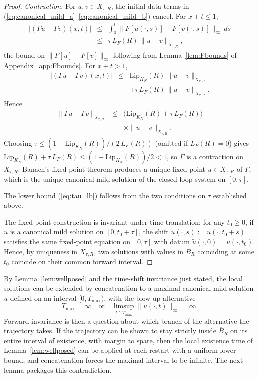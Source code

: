 \documentclass[10pt,a4paper]{amsart}
\newcommand{\LipKn}{\mathrm{Lip}_{K_N}}
\begin{document}
\begin{proof}
\emph{Contraction.} For $u, v \in X_{\tau, R}$, the initial-data terms in (\ref{eq:canonical_mild_a}--\ref{eq:canonical_mild_b}) cancel. For $x + t \le 1$,
\begin{eqnarray}
|(\Gamma u - \Gamma v)(x, t)| &\le& \int_0^t \|F[u(\cdot, s)] - F[v(\cdot, s)]\|_\infty\, ds \nonumber \\
&\le& \tau\, L_F(R)\, \|u - v\|_{X_{\tau, R}},
\label{eq:Gamma_lip_interior}
\end{eqnarray}
the bound on $\|F[u]-F[v]\|_\infty$ following from Lemma~\ref{lem:Fbounds} of Appendix~\ref{app:Fbounds}. For $x + t > 1$,
\begin{eqnarray}
|(\Gamma u - \Gamma v)(x, t)| &\le& \LipKn(R)\,\|u - v\|_{X_{\tau, R}} \nonumber \\
&& + \tau\, L_F(R)\,\|u - v\|_{X_{\tau, R}}.
\label{eq:Gamma_lip_boundary}
\end{eqnarray}
Hence
\begin{eqnarray}
\|\Gamma u - \Gamma v\|_{X_{\tau, R}} &\le& \bigl(\LipKn(R) + \tau\, L_F(R)\bigr) \nonumber \\
&& \times \|u - v\|_{X_{\tau, R}}.
\label{eq:Gamma_contraction}
\end{eqnarray}
Choosing $\tau \le (1 - \LipKn(R))/(2\, L_F(R))$ (omitted if $L_F(R) = 0$) gives $\LipKn(R) + \tau\, L_F(R) \le (1 + \LipKn(R))/2 < 1$, so $\Gamma$ is a contraction on $X_{\tau, R}$. Banach's fixed-point theorem produces a unique fixed point $u \in X_{\tau, R}$ of $\Gamma$, which is the unique canonical mild solution of the closed-loop system on $[0, \tau]$.

The lower bound (\ref{eq:tau_lb}) follows from the two conditions on $\tau$ established above.

The fixed-point construction is invariant under time translation: for any $t_0 \ge 0$, if $u$ is a canonical mild solution on $[0, t_0 + \tau]$, the shift $\tilde u(\cdot, s) := u(\cdot, t_0 + s)$ satisfies the same fixed-point equation on $[0, \tau]$ with datum $\tilde u(\cdot, 0) = u(\cdot, t_0)$. Hence, by uniqueness in $X_{\tau, R}$, two solutions with values in $\overline B_R$ coinciding at some $t_0$ coincide on their common forward interval.
\end{proof}

By Lemma~\ref{lem:wellposed} and the time-shift invariance just stated, the local solutions can be extended by concatenation to a maximal canonical mild solution $u$ defined on an interval $[0, T_{\max})$, with the blow-up alternative
\begin{equation}
T_{\max} = \infty \quad \text{or} \quad \limsup_{t \uparrow T_{\max}} \|u(\cdot, t)\|_\infty = \infty.
\label{eq:blowup_alternative}
\end{equation}
Forward invariance is then a question about which branch of the alternative the trajectory takes. If the trajectory can be shown to stay strictly inside $\overline B_R$ on its entire interval of existence, with margin to spare, then the local existence time of Lemma~\ref{lem:wellposed} can be applied at each restart with a uniform lower bound, and concatenation forces the maximal interval to be infinite. The next lemma packages this contradiction.
\end{document}

